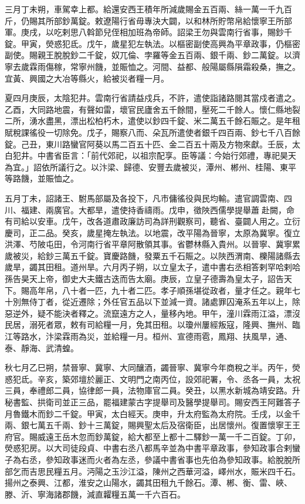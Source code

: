 \begin{pinyinscope}
 三月丁未朔，車駕幸上都。給還安西王積年所減歲賜金五百兩、絲一萬一千九百斤，仍賜其所部鈔萬錠。敕遼陽行省毋專決大闢，以和林所貯幣帛給懷寧王所部軍。庚戌，以吃剌思八斡節兒侄相加班為帝師。詔梁王勿與雲南行省事，賜鈔千錠。甲寅，熒惑犯氐。戊午，歲星犯左執法。以樞密副使高興為平章政事，仍樞密副使。賜親王脫脫鈔二千錠，奴兀倫、孛羅等金五百兩、銀千兩、鈔二萬錠。以濟寧去歲霖雨傷稼，常寧州饑，並賑恤之。河間、益都、般陽屬縣隕霜殺桑，撫之。宜黃、興國之大冶等縣火，給被災者糧一月。



 夏四月庚辰，太陰犯井。雲南行省請益戍兵，不許，遣使詣諸路閱其當戍者遣之。乙酉，大同路地震，有聲如雷，壞官民廬舍五千餘間，壓死二千餘人。懷仁縣地裂二所，湧水盡黑，漂出松柏朽木，遣使以鈔四千錠、米二萬五千餘石賑之。是年租賦稅課徭役一切除免。戊子，賜察八而、朵瓦所遣使者銀千四百兩、鈔七千八百餘錠。己丑，東川路蠻官阿葵以馬二百五十匹、金二百五十兩及方物來獻。壬辰，太白犯井。中書省臣言：「前代郊祀，以祖宗配享。臣等議：今始行郊禮，專祀昊天為宜。」詔依所議行之。以汴梁、歸德、安豐去歲被災，潭州、郴州、桂陽、東平等路饑，並賑恤之。



 五月丁未，詔諸王、駙馬部屬及各投下，凡市傭徭役與民均輸。遣官調雲南、四川、福建、兩廣官。大都旱，遣使持香禱雨。戊申，徵陜西儒學提舉蕭赴闕，命有司給以安車。戊午，改各道肅政廉訪司為詳刑觀察司，聽省、臺闢人用之。立衍慶司，正二品。癸亥，歲星掩左執法。以地震，改平陽為晉寧，太原為冀寧。復立洪澤、芍陂屯田，令河南行省平章阿散領其事。省鬱林縣入貴州。以晉寧、冀寧累歲被災，給鈔三萬五千錠。寶慶路饑，發粟五千石賑之。以陜西渭南、櫟陽諸縣去歲旱，蠲其田租。道州旱。六月丙子朔，以立皇太子，遣中書右丞相答剌罕哈剌哈孫告昊天上帝，御史大夫鐵古迭而告太廟。庚辰，立皇子德壽為皇太子，詔告天下。賜高年帛，八十者一匹，九十者二匹。孝子順孫堪從政者，量才任之。親年七十別無侍丁者，從近遷除；外任官五品以下並減一資。諸處罪囚淹系五年以上，除惡逆外，疑不能決者釋之。流竄遠方之人，量移內地。甲午，潼川霖雨江溢，漂沒民居，溺死者眾，敕有司給糧一月，免其田租。以瓊州屢經叛寇，隆興、撫州、臨江等路水，汴梁霖雨為災，並給糧一月。桓州、宣德雨雹，鳳翔、扶風旱，通、泰、靜海、武清蝗。



 秋七月乙巳朔，禁晉寧、冀寧、大同釀酒，蠲晉寧、冀寧今年商稅之半。丙午，熒惑犯氐。辛亥，築郊壇於麗正、文明門之南丙位，設郊祀署，令、丞各一員，太祝三員，奉禮郎二員，協律郎一員，法物庫官二員。癸丑，以黑水新城為靖安路。升秘書監、拱衛司並正三品，罷福建蒙古字提舉司及醫學提舉司。賜安西王阿難答子月魯鐵木而鈔二千錠。甲寅，太白經天。庚申，升太府監為太府院。壬戌，以金千兩、銀七萬五千兩、鈔十三萬錠，賜興聖太后及宿衛臣，出居懷州。復置懷寧王王府官。賜威遠王岳木忽而鈔萬錠，給大都至上都十二驛鈔一萬一千二百錠。丁卯，熒惑犯房。以大司徒段貞、中書右丞八都馬辛並為中書平章政事，參知政事合剌蠻子為右丞，參知政事迷而火者為左丞，參議中書省事也先伯為參知政事。給脫脫所部乞而吉思民糧五月。沔陽之玉沙江溢，陳州之西華河溢，嶧州水，賑米四千石。揚州之泰興、江都，淮安之山陽水，蠲其田租九千餘石。潭、郴、衡、雷、峽、滕、沂、寧海諸郡饑，減直糶糧五萬一千六百石。




\end{pinyinscope}
